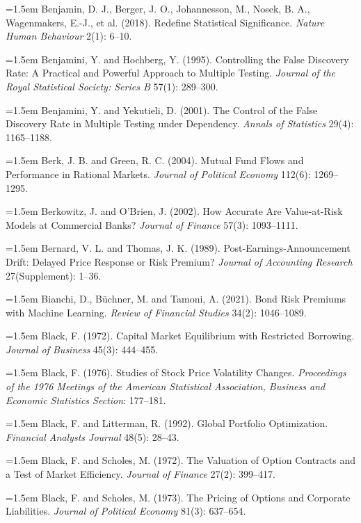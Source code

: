 \hangindent=1.5em Benjamin, D. J., Berger, J. O., Johannesson, M., Nosek, B. A., Wagenmakers, E.-J., et al. (2018). Redefine Statistical Significance. \emph{Nature Human Behaviour} 2(1): 6--10.

\hangindent=1.5em Benjamini, Y. and Hochberg, Y. (1995). Controlling the False Discovery Rate: A Practical and Powerful Approach to Multiple Testing. \emph{Journal of the Royal Statistical Society: Series B} 57(1): 289--300.

\hangindent=1.5em Benjamini, Y. and Yekutieli, D. (2001). The Control of the False Discovery Rate in Multiple Testing under Dependency. \emph{Annals of Statistics} 29(4): 1165--1188.

\hangindent=1.5em Berk, J. B. and Green, R. C. (2004). Mutual Fund Flows and Performance in Rational Markets. \emph{Journal of Political Economy} 112(6): 1269--1295.

\hangindent=1.5em Berkowitz, J. and O'Brien, J. (2002). How Accurate Are Value-at-Risk Models at Commercial Banks? \emph{Journal of Finance} 57(3): 1093--1111.

\hangindent=1.5em Bernard, V. L. and Thomas, J. K. (1989). Post-Earnings-Announcement Drift: Delayed Price Response or Risk Premium? \emph{Journal of Accounting Research} 27(Supplement): 1--36.

\hangindent=1.5em Bianchi, D., B\"uchner, M. and Tamoni, A. (2021). Bond Risk Premiums with Machine Learning. \emph{Review of Financial Studies} 34(2): 1046--1089.

\hangindent=1.5em Black, F. (1972). Capital Market Equilibrium with Restricted Borrowing. \emph{Journal of Business} 45(3): 444--455.

\hangindent=1.5em Black, F. (1976). Studies of Stock Price Volatility Changes. \emph{Proceedings of the 1976 Meetings of the American Statistical Association, Business and Economic Statistics Section}: 177--181.

\hangindent=1.5em Black, F. and Litterman, R. (1992). Global Portfolio Optimization. \emph{Financial Analysts Journal} 48(5): 28--43.

\hangindent=1.5em Black, F. and Scholes, M. (1972). The Valuation of Option Contracts and a Test of Market Efficiency. \emph{Journal of Finance} 27(2): 399--417.

\hangindent=1.5em Black, F. and Scholes, M. (1973). The Pricing of Options and Corporate Liabilities. \emph{Journal of Political Economy} 81(3): 637--654.


